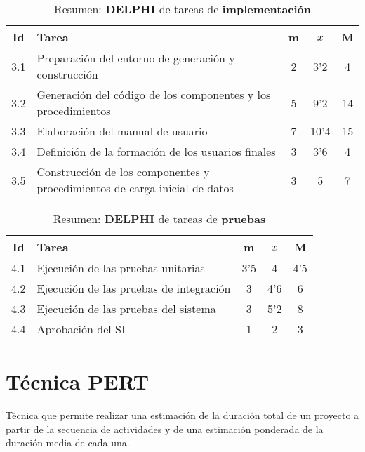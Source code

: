 \documentclass[11pt,a4paper,spanish,twoside]{report}
\begin{document}
\begin{table}[!h]
\centering
  \begin{tabular}{|c||p{8cm}||c|c|c|}
    \hline
    \textbf{Id} & \textbf{Tarea} & \textbf{m} & 
    \textbf{$\bar{x}$} &\textbf{M} \\
    \hline
    3.1 & Preparación del entorno de generación y construcción & 2 & 3'2  & 4 \\
    \hline
    3.2 & Generación del código de los componentes y los procedimientos & 5 &
    9'2 & 14\\
    \hline
    3.3 & Elaboración del manual de usuario & 7 & 10'4 & 15\\
    \hline
    3.4 & Definición de la formación de los usuarios finales & 3 & 3'6 & 4 \\
    \hline
    3.5 & Construcción de los componentes y procedimientos de carga inicial
    de datos & 3 & 5 & 7\\
    \hline
  \end{tabular}
  \caption{Resumen: \textbf{DELPHI} de tareas de \textbf{implementación}}
  \label{Tab:rDELPHIimp}
\end{table}

\begin{table}[!h]
\centering
  \begin{tabular}{|c||p{8cm}||c|c|c|}
    \hline
    \textbf{Id} & \textbf{Tarea} & \textbf{m} & 
    \textbf{$\bar{x}$} &\textbf{M} \\
    \hline
    4.1 & Ejecución de las pruebas unitarias & 3'5 & 4 & 4'5\\
    \hline
    4.2 & Ejecución de las pruebas de integración & 3 & 4'6 & 6\\
    \hline
    4.3 & Ejecución de las pruebas del sistema & 3 & 5'2 & 8\\
    \hline
    4.4 & Aprobación del SI & 1 & 2 & 3 \\
    \hline
  \end{tabular}
  \caption{Resumen: \textbf{DELPHI} de tareas de \textbf{pruebas}}
  \label{Tab:rDELPHIpru}
\end{table}


\chapter{Técnica PERT}
Técnica que permite realizar una estimación de la duración total de un
proyecto a partir de la secuencia de actividades y de una estimación
ponderada de la duración media de cada una. 
\end{document}
